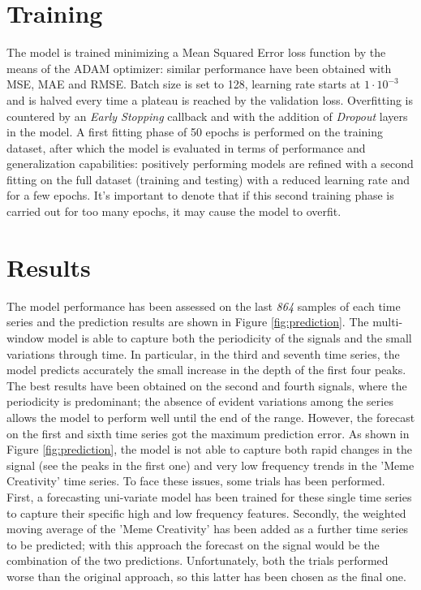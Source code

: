 \documentclass[conference]{IEEEtran}
\begin{document}
\section{Training}
    The model is trained minimizing a Mean Squared Error loss function by the means of the ADAM optimizer: similar performance have been obtained with MSE, MAE and RMSE. Batch size is set to 128, learning rate starts at $1\cdot 10^{-3}$ and is halved every time a plateau is reached by the validation loss. Overfitting is countered by an \textit{Early Stopping} callback and with the addition of \textit{Dropout} layers in the model. A first fitting phase of 50 epochs is performed on the training dataset, after which the model is evaluated in terms of performance and generalization capabilities: positively performing models are refined with a second fitting on the full dataset (training and testing) with a reduced learning rate and for a few epochs. It's important to denote that if this second training phase is carried out for too many epochs, it may cause the model to overfit.

\section{Results}
    The model performance has been assessed on the last \textit{864} samples of each time series and the prediction results are shown in Figure \ref{fig:prediction}.  
    The multi-window model is able to capture both the periodicity of the signals and the small variations through time. In particular, in the third and seventh time series, the model predicts accurately the small increase in the depth of the first four peaks. The best results have been obtained on the second and fourth signals, where the periodicity is predominant; the absence of evident variations among the series allows the model to perform well until the end of the range. 
    However, the forecast on the first and sixth time series got the maximum prediction error. As shown in Figure \ref{fig:prediction}, the model is not able to capture both rapid changes in the signal (see the peaks in the first one) and very low frequency trends in the 'Meme Creativity' time series. 
    To face these issues, some trials has been performed. First, a forecasting uni-variate model has been trained for these single time series to capture their specific high and low frequency features. Secondly, the weighted moving average of the 'Meme Creativity' has been added as a further time series to be predicted; with this approach the forecast on the signal would be the combination of the two predictions. 
    Unfortunately, both the trials performed worse than the original approach, so this latter has been chosen as the final one. 
    
\end{document}
